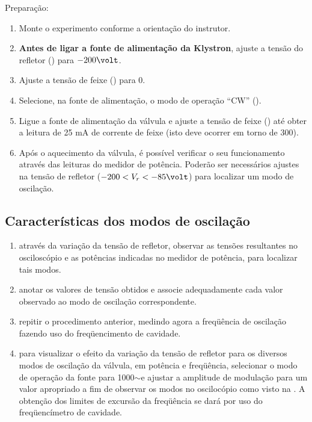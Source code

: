 \documentclass[a4paper,12pt]{article}
\begin{document}
    Preparação:

    \begin{enumerate}
        \alfaenum
        \item Monte o experimento conforme a orientação do instrutor.
        \item \textbf{Antes de ligar a fonte de alimentação da Klystron}, ajuste a tensão do refletor () para $-200\volt$. 
        \item Ajuste a tensão de feixe () para 0\volt.
        \item Selecione, na fonte de alimentação, o modo de operação “CW” ().
        \item Ligue a fonte de alimentação da válvula e ajuste a tensão de feixe () até obter a leitura de 25 mA de corrente de feixe (isto deve ocorrer em torno de 300\volt). 
        \item Após o aquecimento da válvula, é possível verificar o seu funcionamento através das leituras do medidor de potência. Poderão ser necessários ajustes na tensão de refletor ($-200 < V_r < -85 \volt$) para localizar um modo de oscilação.
    \end{enumerate}


        \subsection{Características dos modos de oscilação}

        \begin{enumerate}
            \alfaenum
        \item {} através da variação da tensão de refletor, observar as tensões resultantes no osciloscópio e as potências indicadas no medidor de potência, para localizar tais modos.
        \item {} anotar os valores de tensão obtidos e associe adequadamente cada valor observado ao modo de oscilação correspondente.
        \item {} repitir o procedimento anterior, medindo agora a freqüência de oscilação fazendo uso do freqüencimento de cavidade.
        \item {} para visualizar o efeito da variação da tensão de refletor para os diversos modos de oscilação da válvula, em potência e freqüência, selecionar o modo de operação da fonte para 1000$\sim$\hertz e ajustar a amplitude de modulação para um valor apropriado a fim de observar os modos no oscilocópio como visto na . A obtenção dos limites de excursão da freqüência se dará por uso do freqüencímetro de cavidade.
        \end{enumerate}
\end{document}
